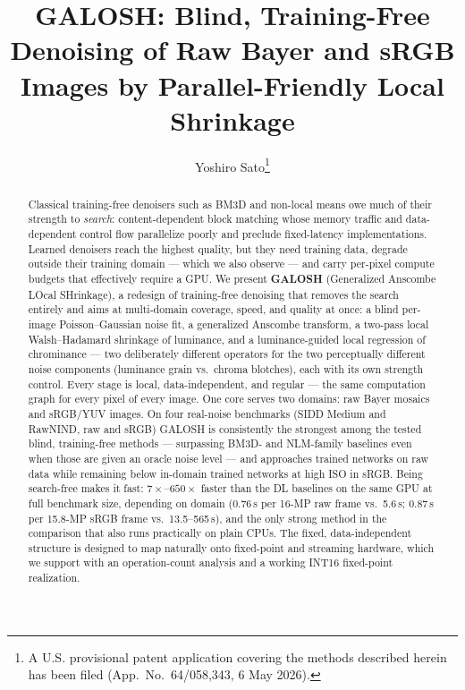 \documentclass[10pt,twocolumn]{article}
\title{\textbf{GALOSH: Blind, Training-Free Denoising of Raw Bayer and sRGB
Images by Parallel-Friendly Local Shrinkage}}
\author{Yoshiro Sato\thanks{A U.S. provisional patent application covering the
methods described herein has been filed (App.\ No.\ 64/058,343, 6 May 2026).}}
\date{}
\begin{document}
\maketitle

\begin{abstract}
Classical training-free denoisers such as BM3D and non-local means owe much of
their strength to \emph{search}: content-dependent block matching whose memory
traffic and data-dependent control flow parallelize poorly and preclude
fixed-latency implementations. Learned denoisers reach the highest quality,
but they need training data, degrade outside their training domain --- which
we also observe --- and carry per-pixel compute budgets that effectively
require a GPU. We present \textbf{GALOSH} (Generalized Anscombe LOcal
SHrinkage), a redesign of training-free denoising that removes the search
entirely and aims at multi-domain coverage, speed, and quality at once: a
blind per-image Poisson--Gaussian noise fit, a generalized Anscombe transform,
a two-pass local Walsh--Hadamard shrinkage of luminance, and a
luminance-guided local regression of chrominance --- two deliberately
different operators for the two perceptually different noise components
(luminance grain vs.\ chroma blotches), each with its own strength control.
Every stage is local, data-independent, and regular --- the
same computation graph for every pixel of every image. One core serves two
domains: raw Bayer mosaics and sRGB/YUV images. On four real-noise benchmarks
(SIDD Medium and RawNIND, raw and sRGB) GALOSH is consistently the strongest
among the tested blind, training-free methods --- surpassing BM3D- and
NLM-family baselines even
when those are given an oracle noise level --- and approaches trained networks
on raw data while remaining below in-domain trained networks at high ISO in
sRGB. Being search-free makes it fast: $7\times$--$650\times$ faster than
the DL baselines on the same GPU at full benchmark size, depending on domain
(0.76\,s per 16-MP raw frame vs.\ 5.6\,s; 0.87\,s per 15.8-MP sRGB frame
vs.\ 13.5--565\,s), and the only strong method in the comparison that also
runs practically on plain CPUs.
The fixed, data-independent structure is designed to map naturally onto
fixed-point and streaming hardware, which we support with an operation-count
analysis and a working INT16 fixed-point realization.
\end{abstract}

\end{document}
